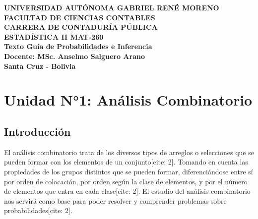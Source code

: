 \documentclass[12pt,a4paper]{book}
\begin{document}
\frontmatter

\begin{titlepage}
\begin{center}
    \vspace*{2cm}
    \textbf{\Large UNIVERSIDAD AUTÓNOMA GABRIEL RENÉ MORENO} \\[0.5cm]
    \textbf{\large FACULTAD DE CIENCIAS CONTABLES} \\[0.5cm]
    \textbf{\large CARRERA DE CONTADURÍA PÚBLICA} \\[2cm]
    
    \textbf{\Huge ESTADÍSTICA II MAT-260} \\[1.5cm]
    \textbf{\Large Texto Guía de Probabilidades e Inferencia} \\[2cm]
    
    \textbf{\large Docente: MSc. Anselmo Salguero Arano} \\[2cm]
    \vfill
    \textbf{\large Santa Cruz - Bolivia} \\
\end{center}
\end{titlepage}

\tableofcontents

\mainmatter

\chapter{Unidad N°1: Análisis Combinatorio}

\section{Introducción}
El análisis combinatorio trata de los diversos tipos de arreglos o selecciones que se pueden formar con los elementos de un conjunto[cite: 2]. Tomando en cuenta las propiedades de los grupos distintos que se pueden formar, diferenciándose entre sí por orden de colocación, por orden según la clase de elementos, y por el número de elementos que entra en cada clase[cite: 2]. El estudio del análisis combinatorio nos servirá como base para poder resolver y comprender problemas sobre probabilidades[cite: 2].
\end{document}
